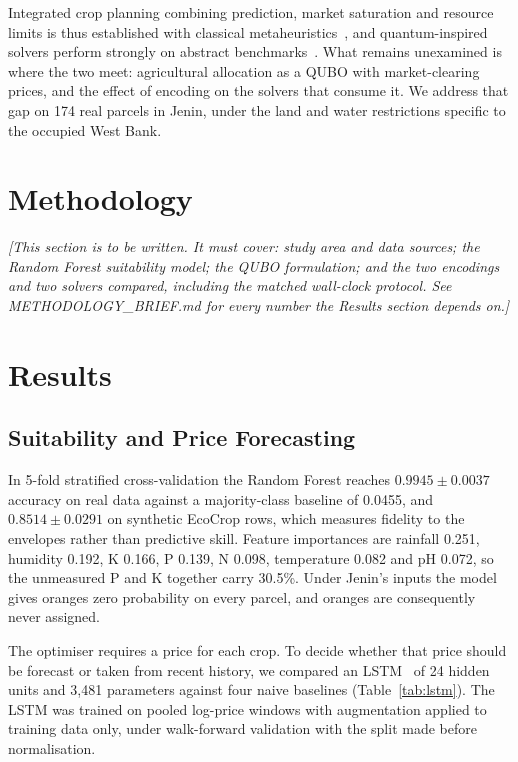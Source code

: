 \documentclass[conference,a4paper]{IEEEtran}
\begin{document}
Integrated crop planning combining prediction, market saturation and
resource limits is thus established with classical
metaheuristics~\cite{li2025,hou2026}, and quantum-inspired solvers perform
strongly on abstract benchmarks~\cite{zeng2024,kim2025}. What remains
unexamined is where the two meet: agricultural allocation as a QUBO with
market-clearing prices, and the effect of encoding on the solvers that
consume it. We address that gap on 174 real parcels in Jenin, under the land
and water restrictions specific to the occupied West Bank.

\section{Methodology}
\label{sec:method}

\textit{[This section is to be written. It must cover: study area and
data sources; the Random Forest suitability model; the QUBO formulation;
and the two encodings and two solvers compared, including the matched
wall-clock protocol. See METHODOLOGY\_BRIEF.md for every number the
Results section depends on.]}

\section{Results}
\label{sec:results}

\subsection{Suitability and Price Forecasting}

In 5-fold stratified cross-validation the Random Forest reaches
$0.9945\pm0.0037$ accuracy on real data against a majority-class baseline of
0.0455, and $0.8514\pm0.0291$ on synthetic EcoCrop rows, which measures
fidelity to the envelopes rather than predictive skill. Feature
importances are rainfall 0.251, humidity 0.192, K 0.166, P 0.139, N 0.098,
temperature 0.082 and pH 0.072, so the unmeasured P and K together carry
30.5\%. Under Jenin's inputs the model gives oranges zero probability on every
parcel, and oranges are consequently never assigned.

The optimiser requires a price for each crop. To decide whether that price
should be forecast or taken from recent history, we compared an
LSTM~\cite{hochreiter1997} of 24 hidden units and 3{,}481 parameters against
four naive baselines (Table~\ref{tab:lstm}). The LSTM was trained on pooled
log-price windows with augmentation applied to training data only, under
walk-forward validation with the split made before normalisation.
\end{document}
